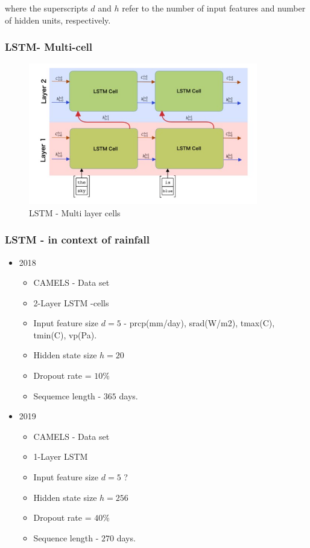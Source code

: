 \documentclass[12pt]{report}
\begin{document}
where the superscripts $d$ and $h$ refer to the number of input features and number of hidden units, respectively.


\subsubsection{LSTM- Multi-cell}

\begin{figure}[H]\centering\includegraphics[width=10cm]{LSTM_MULTI.png}\caption{LSTM - Multi layer cells}\end{figure}
\subsubsection{LSTM - in context of rainfall}

\begin{itemize}
	\item 2018
	\begin{itemize}
		\item CAMELS - Data set
		\item 2-Layer LSTM -cells
		\item Input feature size $d=5$ - prcp(mm/day), srad(W/m2), tmax(C), tmin(C), vp(Pa). 
		\item Hidden state  size $h=20$
		\item Dropout rate = $10\%$
		\item Sequemce length - $365$ days. 
	\end{itemize} 
	\item 2019
	\begin{itemize}
		\item CAMELS - Data set
		\item 1-Layer LSTM 
		\item Input feature size $d=5$ ? 
		\item Hidden state  size $h=256$
		\item Dropout rate = $40\%$
		\item Sequence length - $270$ days. 
	\end{itemize} 	
\end{itemize}
\end{document}
